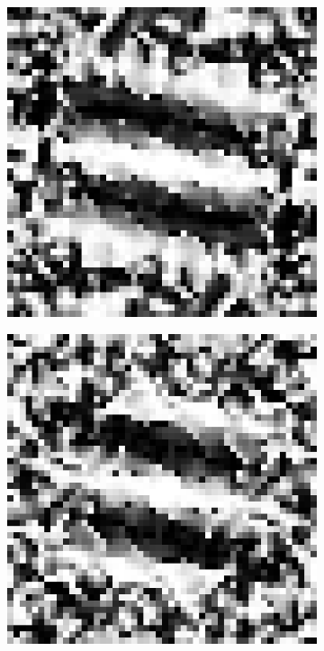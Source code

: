 \begin{figure}[htpb]
\begin{subfigure}{.25\textwidth}
\end{subfigure}%
\begin{subfigure}{.25\textwidth}
\includegraphics[width=1\textwidth]{img/CPSsigma75}
\end{subfigure}%
\begin{subfigure}{.25\textwidth}
\includegraphics[width=1\textwidth]{img/CPSsigma150}

\end{subfigure}
\end{figure}
